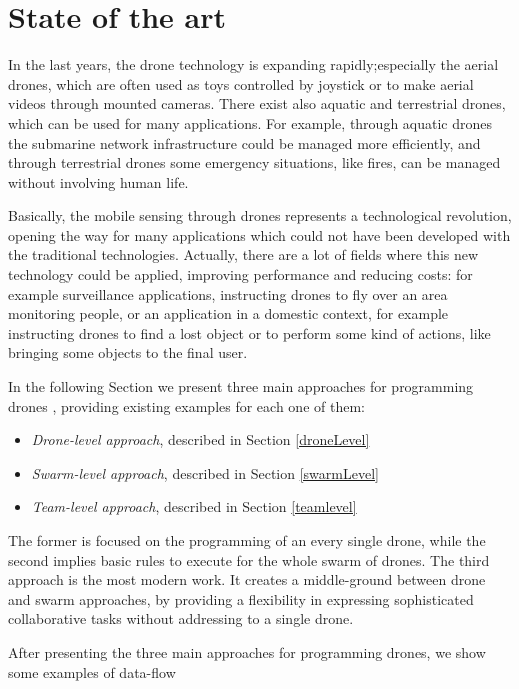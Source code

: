 \chapter{State of the art}
\label{cap2}

In the last years, the drone technology is expanding rapidly;especially the aerial drones, which are often used as toys controlled by joystick  or to make aerial videos through mounted cameras.
There exist also aquatic and terrestrial drones, which can be used for many applications. 
For example, through aquatic drones the submarine network infrastructure\cite{submarine} could be managed more efficiently, and through terrestrial drones some emergency situations, like fires, can be managed without involving human life.

Basically, the mobile sensing through drones represents a technological revolution, opening the way for many applications which could not have been developed with the traditional technologies.
Actually, there are a lot of fields where this new technology could be applied, improving performance and reducing costs:
for example surveillance applications, instructing drones to fly over an area monitoring people, or an application in a domestic context, for example instructing drones to find a lost object or to perform some kind of actions, like bringing some objects to the final user.

In the following Section we present three main approaches for programming drones , providing existing examples for each one of them:

\begin{itemize}
\itemsep2pt
\item{
\textit{Drone-level approach}, described in Section \ref{droneLevel}
}
\item{
\textit{Swarm-level approach}, described in Section \ref{swarmLevel}
}
\item{
\textit{Team-level approach}, described in Section \ref{teamlevel}
}
\end{itemize}

The former is focused on the programming of an every single drone, while the second implies basic rules to execute for the whole swarm of drones. The third approach is the most modern work. It creates a middle-ground between drone and swarm approaches, by providing a flexibility in expressing sophisticated collaborative tasks without addressing to a single drone.

After presenting the three main approaches for programming drones, we show some examples of data-flow

